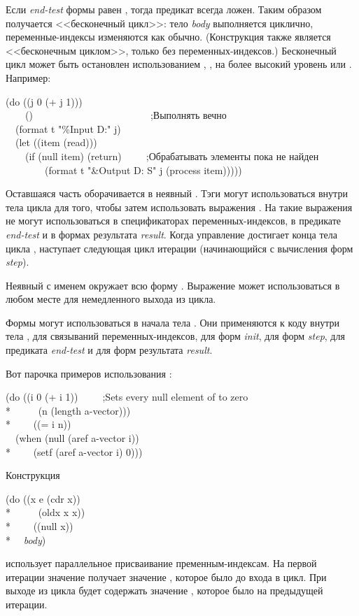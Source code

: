 \begin{defmac}
Если \emph{end-test} формы  равен \cd{{\false}}, тогда предикат всегда
ложен.
Таким образом получается <<бесконечный цикл>>:
тело \emph{body}  выполняется циклично, переменные-индексы изменяются
как обычно. (Конструкция  также является <<бесконечным циклом>>,
только без переменных-индексов.)
Бесконечный цикл может быть остановлен использованием ,
,  на более высокий уровень или .
Например:
\begin{lisp}
(do ((j 0 (+ j 1))) \\
~~~~({\false})~~~~~~~~~~~~~~~~~~~~~~~~;\textrm{Выполнять вечно} \\
~~(format t "{\Xtilde}\%Input {\Xtilde}D:" j) \\
~~(let ((item (read))) \\
~~~~(if (null item) (return)~~~~~;\textrm{Обрабатывать элементы пока не найден {\false}} \\
~~~~~~~~(format t "{\Xtilde}\&Output {\Xtilde}D: {\Xtilde}S" j (process item)))))
\end{lisp}

Оставшаяся часть  оборачивается в неявный .
Тэги могут использоваться внутри тела цикла  для того, чтобы затем
использовать выражения . На такие выражения  не могут
использоваться в спецификаторах переменных-индексов, в предикате
\emph{end-test} и в формах результата \emph{result}.
Когда управление достигает конца тела цикла , наступает следующая
цикл итерации (начинающийся с вычисления форм \emph{step}).

Неявный  с именем {\nil} окружает всю форму .
Выражение  может использоваться в любом месте для немедленного
выхода из цикла.

Формы  могут использоваться в начала тела .
Они применяются к коду внутри тела , для связываний переменных-индексов,
для форм \emph{init}, для форм \emph{step}, для предиката \emph{end-test} и для
форм результата \emph{result}.

Вот парочка примеров использования :
\begin{lisp}
(do ((i 0 (+ i 1))~~~~~;\textrm{Sets every null element of  to zero} \\*
~~~~~(n (length a-vector))) \\*
~~~~((= i n)) \\
~~(when (null (aref a-vector i)) \\*
~~~~(setf (aref a-vector i) 0)))
\end{lisp}
Конструкция
\begin{lisp}
(do ((x e (cdr x)) \\*
~~~~~(oldx x x)) \\*
~~~~((null x)) \\*
~~\emph{body})
\end{lisp}
использует параллельное присваивание пременным-индексам. На первой итерации
значение  получает значение , которое было до входа в цикл.
При выходе из цикла  будет содержать значение , которое было на
предыдущей итерации.


\end{defmac}
